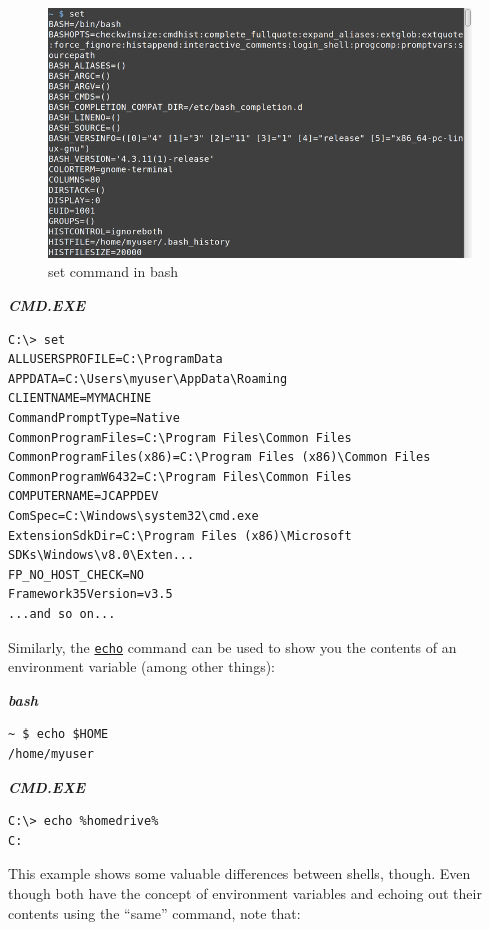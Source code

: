 \documentclass[10pt,]{book}
\numberwithin{figure}{chapter}
\begin{document}
\else

\begin{figure}[htbp]
\centering
\includegraphics{./images/set.png}
\caption{set command in bash}
\end{figure}

\fi

\textbf{\emph{CMD.EXE}}

\begin{verbatim}
C:\> set
ALLUSERSPROFILE=C:\ProgramData
APPDATA=C:\Users\myuser\AppData\Roaming
CLIENTNAME=MYMACHINE
CommandPromptType=Native
CommonProgramFiles=C:\Program Files\Common Files
CommonProgramFiles(x86)=C:\Program Files (x86)\Common Files
CommonProgramW6432=C:\Program Files\Common Files
COMPUTERNAME=JCAPPDEV
ComSpec=C:\Windows\system32\cmd.exe
ExtensionSdkDir=C:\Program Files (x86)\Microsoft SDKs\Windows\v8.0\Exten...
FP_NO_HOST_CHECK=NO
Framework35Version=v3.5
...and so on...
\end{verbatim}

Similarly, the \href{http://linux.die.net/man/1/echo}{\texttt{echo}}
command can be used to show you the contents of an environment variable
(among other things):

\textbf{\emph{bash}}

\begin{verbatim}
~ $ echo $HOME
/home/myuser
\end{verbatim}

\textbf{\emph{CMD.EXE}}

\begin{verbatim}
C:\> echo %homedrive%
C:
\end{verbatim}

This example shows some valuable differences between shells, though.
Even though both have the concept of environment variables and echoing
out their contents using the ``same'' command, note that:
\end{document}
